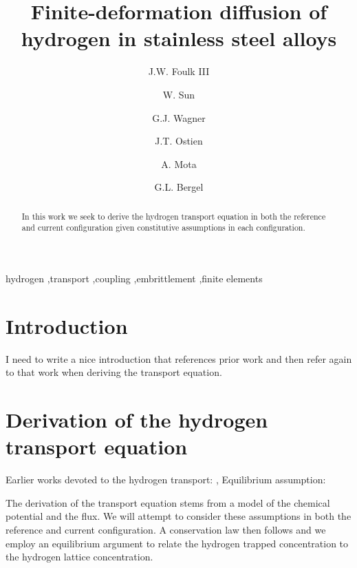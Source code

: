 \documentclass[10pt]{elsarticle}
\begin{document}
%
\begin{frontmatter}
%
\title{Finite-deformation diffusion of hydrogen in stainless steel alloys}

\author[SNL]{J.W. Foulk III} \author[UC]{W. Sun}\author[NW]{G.J. Wagner}\author[SNL]{J.T. Ostien}\author[SNL]{A. Mota}
\author[UCB]{G.L. Bergel} 
\address[SNL]{Sandia National Laboratories, Livermore, CA, 94550, USA}
\address[UC]{Columbia University, New York, NY, 10027, USA}
\address[NW]{Northwestern University, Evanston, IL, 60208, USA}
\address[UCB]{University of California, Berkeley, Berkeley, CA 94720, USA}
\begin{abstract}
In this work we seek to derive the hydrogen transport equation in both the reference and current configuration given constitutive assumptions in each configuration. \end{abstract}
\begin{keyword}
hydrogen \sep transport \sep coupling \sep embrittlement
\sep finite elements
\end{keyword}
\end{frontmatter}
%
%
\section{Introduction}
\label{section.introduction}

I need to write a nice introduction that references prior work and then refer again to that work when deriving the transport equation.
\section{Derivation of the hydrogen transport equation}

Earlier works devoted to the hydrogen transport:  \cite{Sofronis1989}, \cite{Krom1998}
Equilibrium assumption: \cite{Oriani1970}

The derivation of the transport equation stems from a model of the chemical potential and the flux. We will attempt to consider these assumptions in both the reference and current configuration. A conservation law then follows and we employ an equilibrium argument to relate the hydrogen trapped concentration to the hydrogen lattice concentration.
\end{document}
